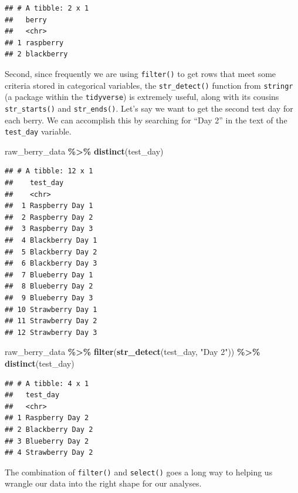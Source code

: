 \documentclass[
]{book}
\newenvironment{Shaded}{\begin{snugshade}}{\end{snugshade}}
\newcommand{\FunctionTok}[1]{\textcolor[rgb]{0.13,0.29,0.53}{\textbf{#1}}}
\newcommand{\NormalTok}[1]{#1}
\newcommand{\SpecialCharTok}[1]{\textcolor[rgb]{0.81,0.36,0.00}{\textbf{#1}}}
\newcommand{\StringTok}[1]{\textcolor[rgb]{0.31,0.60,0.02}{#1}}
\begin{document}
\begin{verbatim}
## # A tibble: 2 x 1
##   berry     
##   <chr>     
## 1 raspberry 
## 2 blackberry
\end{verbatim}

Second, since frequently we are using \texttt{filter()} to get rows that meet some criteria stored in categorical variables, the \texttt{str\_detect()} function from \texttt{stringr} (a package within the \texttt{tidyverse}) is extremely useful, along with its cousins \texttt{str\_starts()} and \texttt{str\_ends()}. Let's say we want to get the second test day for each berry. We can accomplish this by searching for ``Day 2'' in the text of the \texttt{test\_day} variable.

\begin{Shaded}
\begin{Highlighting}[]
\NormalTok{raw\_berry\_data }\SpecialCharTok{\%\textgreater{}\%}
  \FunctionTok{distinct}\NormalTok{(test\_day)}
\end{Highlighting}
\end{Shaded}

\begin{verbatim}
## # A tibble: 12 x 1
##    test_day        
##    <chr>           
##  1 Raspberry Day 1 
##  2 Raspberry Day 2 
##  3 Raspberry Day 3 
##  4 Blackberry Day 1
##  5 Blackberry Day 2
##  6 Blackberry Day 3
##  7 Blueberry Day 1 
##  8 Blueberry Day 2 
##  9 Blueberry Day 3 
## 10 Strawberry Day 1
## 11 Strawberry Day 2
## 12 Strawberry Day 3
\end{verbatim}

\begin{Shaded}
\begin{Highlighting}[]
\NormalTok{raw\_berry\_data }\SpecialCharTok{\%\textgreater{}\%}
  \FunctionTok{filter}\NormalTok{(}\FunctionTok{str\_detect}\NormalTok{(test\_day, }\StringTok{"Day 2"}\NormalTok{)) }\SpecialCharTok{\%\textgreater{}\%}
  \FunctionTok{distinct}\NormalTok{(test\_day)}
\end{Highlighting}
\end{Shaded}

\begin{verbatim}
## # A tibble: 4 x 1
##   test_day        
##   <chr>           
## 1 Raspberry Day 2 
## 2 Blackberry Day 2
## 3 Blueberry Day 2 
## 4 Strawberry Day 2
\end{verbatim}

The combination of \texttt{filter()} and \texttt{select()} goes a long way to helping us wrangle our data into the right shape for our analyses.
\end{document}
